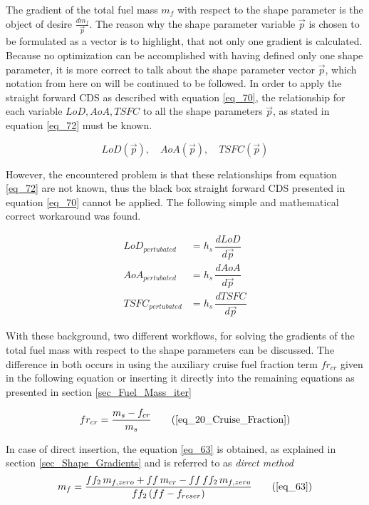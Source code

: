 The gradient of the total fuel mass 
$m_f$ with respect to the shape 
parameter is the object of desire
$\frac{dm_f}{\vec{p}}$. The reason 
why the shape parameter variable 
$\vec{p}$ is chosen to be formulated as 
a vector is to highlight, that 
not only one gradient is calculated.
Because no optimization can 
be accomplished with having defined 
only one shape parameter, it is more 
correct to talk about the shape 
parameter vector $\vec{p}$, which 
notation from here on will be continued 
to be followed.
In order to apply the straight forward CDS as described 
with equation \eqref{eq_70}, the relationship for each 
variable $LoD, AoA, TSFC$ to all the shape parameters 
$\vec{p}$, as stated in equation \eqref{eq_72}
must be known.

\begin{equation}
    \label{eq_72}
    LoD(\vec{p}),  \quad AoA(\vec{p}), \quad TSFC(\vec{p})
\end{equation}

However, the encountered problem is that these relationships 
from equation \eqref{eq_72} are not known, thus the 
black box straight forward CDS presented in equation 
\eqref{eq_70} cannot be applied.
The following simple and mathematical correct workaround was found. 

\begin{align}
    LoD_{pertubated} &= h_s \, \dfrac{dLoD}{d\vec{p}} \label{eq_73}\\
    AoA_{pertubated} &=  h_s \, \dfrac{dAoA}{d\vec{p}}\\
    TSFC_{pertubated} &=  h_s \, \dfrac{dTSFC}{d\vec{p}} \label{eq_74}
\end{align}


With these background, two different workflows, for 
solving the gradients of the total fuel mass 
with respect to the shape parameters can be 
discussed. The difference in both occurs in 
using the auxiliary cruise fuel fraction term 
$fr_{cr}$ given in the following equation 
or inserting it directly into the remaining 
equations as presented in section \eqref{sec_Fuel_Mass_iter}

\begin{equation}
    fr_{cr} =  \frac{m_s - f_{cr}}{m_s} \tag{\ref{eq_20_Cruise_Fraction}}
\end{equation}

In case of direct insertion, the equation 
\eqref{eq_63} is obtained, as explained 
in section \ref{sec_Shape_Gradients} and 
is referred to as \emph{direct method}
\begin{equation}
    m_f = \dfrac{ff_2 \, m_{f, zero} + ff \, m_{cr} - ff \, ff_2 \, m_{f, zero}}
    {ff_2 \, (ff - f_{reser})} \tag{\ref{eq_63}}
\end{equation}

